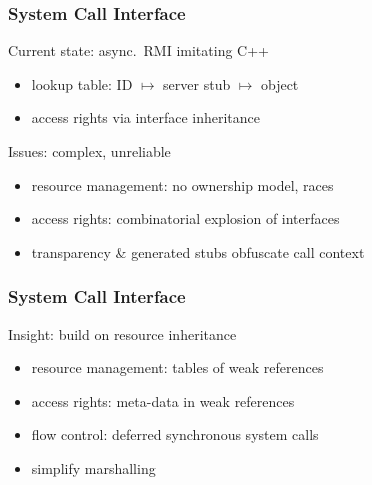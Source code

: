 \documentclass[9pt]{beamer}
\begin{document}
\begin{frame}
  \frametitle{System Call Interface}

  \begin{block}{Current state: async.\ RMI imitating C++}
    \begin{itemize}
    \item lookup table: ID $\mapsto$ server stub $\mapsto$  object
    \item access rights via interface inheritance
    \end{itemize}
  \end{block}

  \vfill
  \vfill

  \begin{block}{Issues: complex, unreliable}
    \begin{itemize}
    \item resource management: no ownership model, races
    \item access rights: combinatorial explosion of interfaces
    \item transparency \& generated stubs obfuscate call context
    \end{itemize}
  \end{block}
\end{frame}

\begin{frame}
  \frametitle{System Call Interface}

  \vfill

  \begin{block}{Insight: build on resource inheritance}
    \begin{itemize}
    \item resource management: tables of weak references
    \item access rights: meta-data in weak references
    \item flow control: deferred synchronous system calls
    \item simplify marshalling
    \end{itemize}
  \end{block}
\end{frame}
\end{document}
